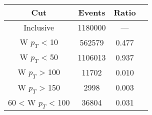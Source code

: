 \begin{tabular}{|c||c|c|c|}
\hline
Cut & Events & Ratio\\\hline
Inclusive & 1180000 & — \\
W $p_{T}$ < 10 & 562579 & 0.477 \\
W $p_{T}$ < 50 & 1106013 & 0.937 \\
W $p_{T}$ > 100 & 11702 & 0.010 \\
W $p_{T}$ > 150 & 2998 & 0.003 \\
60 < W $p_{T}$ < 100 & 36804 & 0.031 \\
\hline
\end{tabular}
